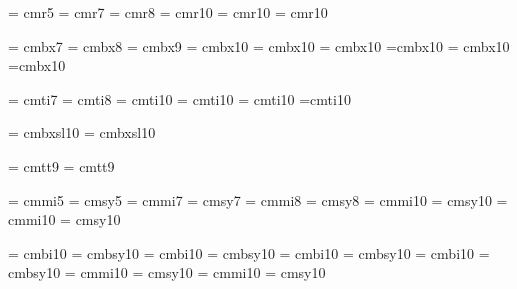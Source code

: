 \Font\prmfive	= cmr5
\Font\prmseven	= cmr7
\Font\prmeight	= cmr8
\Font\prmten	= cmr10
\Font\prmeleven = cmr10 \sc \mh
\Font\prmtwelve = cmr10 \sc \mi

\Font\prbseven	= cmbx7
\Font\prbeight	= cmbx8
\Font\prbnine	= cmbx9
\Font\prbten	= cmbx10
\Font\prbeleven = cmbx10 \sc \mh
\Font\prbtwelve = cmbx10 \sc \mi
\Font\prbfourteen=cmbx10 \sc \mii
\Font\prbsixteen= cmbx10 \sc \miii
\Font\prbeighteen=cmbx10 \sc \miii

\Font\priseven	= cmti7
\Font\prieight	= cmti8
\Font\priten	= cmti10
\Font\prieleven = cmti10 \sc \mh
\Font\pritwelve = cmti10 \sc \mi
\Font\prifourteen=cmti10 \sc \mii

\Font\prbiten	= cmbxsl10
\Font\prbieleven= cmbxsl10 \sc \mh

\Font\lgseven	= cmtt9
\Font\lgnine	= cmtt9

\font\mifive	= cmmi5			\font\syfive	= cmsy5
\font\miseven	= cmmi7			\font\syseven	= cmsy7
\font\mieight	= cmmi8			\font\syeight	= cmsy8
\font\miten	= cmmi10		\font\syten	= cmsy10
\font\mieleven	= cmmi10 \sc \mh	\font\syeleven	= cmsy10 \sc \mh

\font\bmiten	 = cmbi10		\font\bsyten	 = cmbsy10
\font\bmieleven	 = cmbi10 \sc \mh	\font\bsyeleven	 = cmbsy10 \sc \mh
\font\bmitwelve	 = cmbi10 \sc \mi	\font\bsytwelve	 = cmbsy10 \sc \mi
\font\bmifourteen= cmbi10 \sc \mii	\font\bsyfourteen= cmbsy10 \sc \mii
\font\bmisixteen = cmmi10 \sc \miii	\font\bsysixteen = cmsy10  \sc \miii
\font\bmieighteen= cmmi10 \sc \miii	\font\bsyeighteen= cmsy10  \sc \miii
